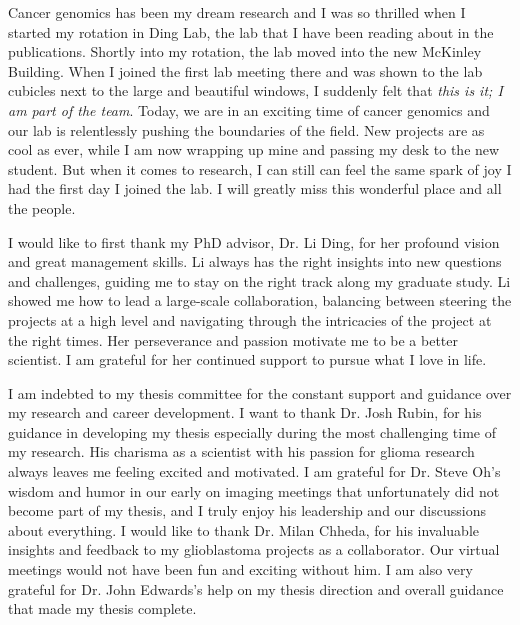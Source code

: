 \thesisacknowledgments

Cancer genomics has been my dream research and I was so thrilled when I started my rotation in Ding Lab, the lab that I have been reading about in the publications.
Shortly into my rotation, the lab moved into the new McKinley Building.
When I joined the first lab meeting there and was shown to the lab cubicles next to the large and beautiful windows, I suddenly felt that \textit{this is it; I am part of the team}.
Today, we are in an exciting time of cancer genomics and our lab is relentlessly pushing the boundaries of the field.
New projects are as cool as ever, while I am now wrapping up mine and passing my desk to the new student.
But when it comes to research, I can still can feel the same spark of joy I had the first day I joined the lab.
I will greatly miss this wonderful place and all the people.

I would like to first thank my PhD advisor, Dr. Li Ding, for her profound vision and great management skills.
Li always has the right insights into new questions and challenges, guiding me to stay on the right track along my graduate study.
Li showed me how to lead a large-scale collaboration, balancing between steering the projects at a high level and navigating through the intricacies of the project at the right times.
Her perseverance and passion motivate me to be a better scientist.
I am grateful for her continued support to pursue what I love in life.

I am indebted to my thesis committee for the constant support and guidance over my research and career development.
I want to thank Dr. Josh Rubin, for his guidance in developing my thesis especially during the most challenging time of my research.
His charisma as a scientist with his passion for glioma research always leaves me feeling excited and motivated.
I am grateful for Dr. Steve Oh's wisdom and humor in our early on imaging meetings that unfortunately did not become part of my thesis, and I truly enjoy his leadership and our discussions about everything.
I would like to thank Dr. Milan Chheda, for his invaluable insights and feedback to my glioblastoma projects as a collaborator.
Our virtual meetings would not have been fun and exciting without him.
I am also very grateful for Dr. John Edwards's help on my thesis direction and overall guidance that made my thesis complete.

